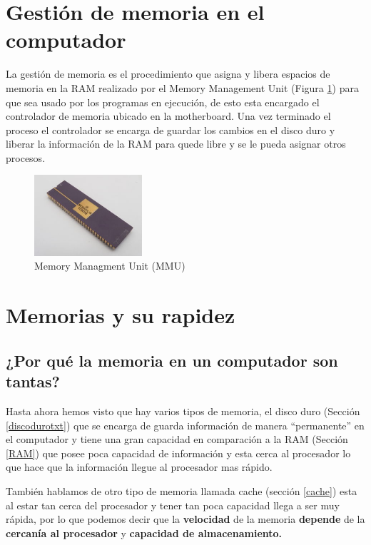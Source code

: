 \documentclass{article}
\begin{document}
\section{Gestión de memoria en el computador}

La gestión de memoria es el procedimiento que asigna y libera espacios de memoria en la RAM realizado por el Memory Management Unit (Figura \ref{fig:MMU})  para que sea usado por los programas en ejecución, de esto esta encargado el controlador de memoria  ubicado en la motherboard.
\cite{UdManizales} Una vez terminado el proceso el controlador se encarga de guardar los cambios en el disco duro y liberar la información de la RAM para quede libre y se le pueda asignar otros procesos.

\begin{figure}[h]
\includegraphics[width=4cm]{Images/MMU.jpg}
\centering
\caption{Memory Managment Unit (MMU)}
\label{fig:MMU}
\end{figure}

\section{Memorias y su rapidez}

\subsection{¿Por qué la memoria en un computador son tantas?}
Hasta ahora hemos visto que hay varios tipos de memoria, el disco duro (Sección \ref{discodurotxt}) que se encarga de guarda información de manera ``permanente''
en el computador y tiene una gran capacidad en comparación a la RAM (Sección \ref{RAM}) que posee poca capacidad de información y esta cerca al procesador lo que hace que la información llegue al procesador mas rápido.

\vspace{0.5cm}

También hablamos de otro tipo de memoria llamada cache (sección \ref{cache}) esta al estar tan cerca del procesador y tener tan poca capacidad llega a ser muy rápida, por lo que podemos decir que la \textbf{velocidad} de la memoria \textbf{depende} de la \textbf{cercanía al procesador} y \textbf{capacidad de almacenamiento.}
\end{document}

